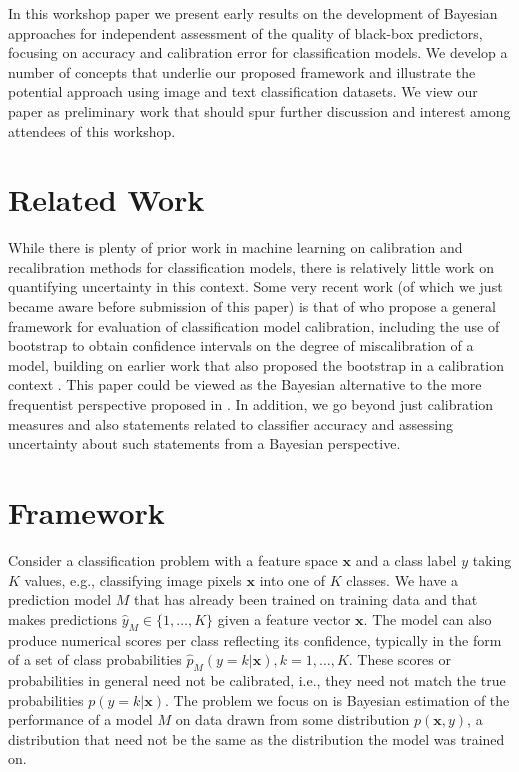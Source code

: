 \documentclass{article}
\newcommand{\ux}{{\mathbf{x}}}
\begin{document}
In this workshop paper we present early results on the development of Bayesian approaches for independent assessment of the quality of black-box predictors, focusing on accuracy and calibration error for classification models.
We develop a number of concepts that underlie our proposed framework and illustrate the potential approach using image and text classification datasets.
We view our paper as preliminary work that should spur further discussion and interest among attendees of this workshop.


\section{Related Work}

While there is plenty of prior work in machine learning on calibration and recalibration methods for classification models, there is relatively little work on quantifying uncertainty in this context.
Some very recent work (of which we just became aware before submission of this paper) is that of \cite{vaicenavicius19a} who propose a general framework for evaluation of classification model calibration, including the use of bootstrap to obtain confidence intervals on the degree of miscalibration of a model, building on earlier work that also proposed the bootstrap in a calibration context \cite{brocker2007increasing}.
This paper could be viewed as the Bayesian alternative to the more frequentist perspective proposed in \cite{vaicenavicius19a}.
In addition, we go beyond just calibration measures and also statements related to classifier accuracy and assessing uncertainty about such statements from a Bayesian perspective.


\section{Framework}

Consider a classification problem with a feature space $\ux$ and a class label $y$ taking $K$ values, e.g., classifying image pixels $\ux$ into one of $K$ classes.
We have a prediction model $M$ that has already been trained on training data and that makes predictions $\hat{y}_M \in \{1, \ldots, K\}$ given a feature vector $\ux$.
The model can also produce numerical scores per class reflecting its confidence, typically in the form of a set of class probabilities $\hat{p}_M(y = k | \ux), k = 1,\ldots,K$.
These scores or probabilities in general need not be calibrated, i.e., they need not match the true probabilities $p(y=k | \ux)$.
The problem we focus on is Bayesian estimation of the performance of a model $M$ on data drawn from some distribution $p(\ux,y)$, a distribution that need not be the same as the distribution the model was trained on.
\end{document}
